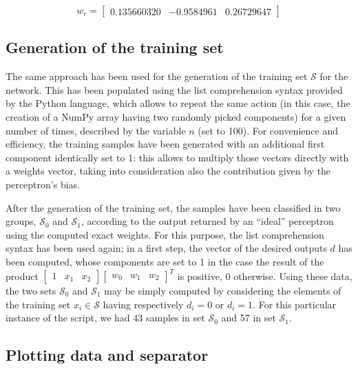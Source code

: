 \documentclass[letterpaper,headings=standardclasses]{scrartcl}
\begin{document}
$$ w_r = [\begin{matrix} 0.135660320 & -0.9584961 & 0.26729647 \end{matrix}] $$

\subsection{Generation of the training set}

The same approach has been used for the generation of the training set $\mathcal{S}$ for the network. This has been populated using the list comprehension syntax provided by the Python language, which allows to repeat the same action (in this case, the creation of a NumPy array having two randomly picked components) for a given number of times, described by the variable $n$ (set to 100). For convenience and efficiency, the training samples have been generated with an additional first component identically set to 1: this allows to multiply those vectors directly with a weights vector, taking into consideration also the contribution given by the perceptron's bias.

After the generation of the training set, the samples have been classified in two groups, $\mathcal{S}_0$ and $\mathcal{S}_1$, according to the output returned by an “ideal” perceptron using the computed exact weights. For this purpose, the list comprehension syntax has been used again; in a first step, the vector of the desired outputs $d$ has been computed, whose components are set to 1 in the case the result of the product $[ \begin{matrix}1 & x_1 & x_2 \end{matrix}][\begin{matrix} w_0 & w_1 & w_2 \end{matrix}]^T$ is positive, 0 otherwise. Using these data, the two sets $\mathcal{S}_0$ and $\mathcal{S}_1$ may be simply computed by considering the elements of the training set $x_i \in \mathcal{S}$ having respectively $d_i = 0$ or $d_i = 1$. For this particular instance of the script, we had 43 samples in set $\mathcal{S}_0$ and 57 in set $\mathcal{S}_1$.

\subsection{Plotting data and separator}
\end{document}
